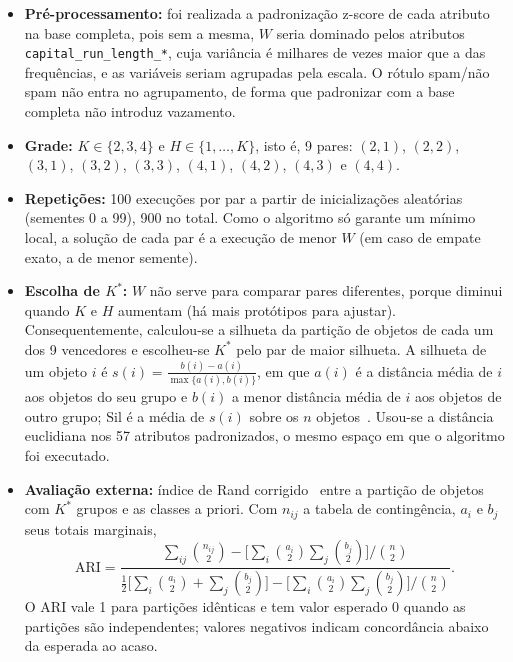 \documentclass[11pt,a4paper]{article}
\newcommand{\Sil}{\mathrm{Sil}}
\newcommand{\ARI}{\mathrm{ARI}}
\begin{document}
\begin{itemize}
\item \textbf{Pré-processamento:} foi realizada a padronização z-score de cada atributo na base completa, pois sem a mesma, $W$ seria
  dominado pelos atributos \texttt{capital\_run\_length\_*}, cuja variância é milhares de vezes maior que a das frequências, e as variáveis 
  seriam agrupadas pela escala. O rótulo spam/não spam não entra no agrupamento, de forma que padronizar com a base completa não introduz vazamento.
\item \textbf{Grade:} $K\in\{2,3,4\}$ e $H\in\{1,\dots,K\}$, isto é, 9 pares: $(2,1)$, $(2,2)$, $(3,1)$, $(3,2)$,
  $(3,3)$, $(4,1)$, $(4,2)$, $(4,3)$ e $(4,4)$.
\item \textbf{Repetições:} 100 execuções por par a partir de inicializações aleatórias (sementes 0 a 99), 900 no
  total. Como o algoritmo só garante um mínimo local, a solução de cada par é a execução de menor $W$ (em caso
  de empate exato, a de menor semente).
\item \textbf{Escolha de $K^*$:} $W$ não serve para comparar pares diferentes, porque diminui quando $K$ e $H$ aumentam (há mais protótipos para ajustar). 
  Consequentemente, calculou-se a silhueta da partição de objetos de cada um dos 9 vencedores e escolheu-se $K^*$ pelo par de maior silhueta. 
  A silhueta de um objeto $i$ é $s(i)=\frac{b(i)-a(i)}{\max\{a(i),b(i)\}}$, em que $a(i)$ é a distância média de $i$ aos objetos do seu grupo e
  $b(i)$ a menor distância média de $i$ aos objetos de outro grupo; $\Sil$ é a média de $s(i)$ sobre os $n$ objetos~\cite{rousseeuw1987silhouettes}. 
  Usou-se a distância euclidiana nos 57 atributos padronizados, o mesmo espaço em que o algoritmo foi executado.
\item \textbf{Avaliação externa:} índice de Rand corrigido~\cite{hubert1985comparing} entre a partição de
  objetos com $K^*$ grupos e as classes a priori. Com $n_{ij}$ a tabela de contingência, $a_i$ e $b_j$ seus totais
  marginais,
  \begin{equation}
  \ARI=\frac{\sum_{ij}\binom{n_{ij}}{2}-\Big[\sum_i\binom{a_i}{2}\sum_j\binom{b_j}{2}\Big]\Big/\binom{n}{2}}
  {\frac12\Big[\sum_i\binom{a_i}{2}+\sum_j\binom{b_j}{2}\Big]-\Big[\sum_i\binom{a_i}{2}\sum_j\binom{b_j}{2}\Big]\Big/\binom{n}{2}} .
  \end{equation}
  O ARI vale 1 para partições idênticas e tem valor esperado 0 quando as partições são independentes; valores
  negativos indicam concordância abaixo da esperada ao acaso.
\end{itemize}
\end{document}
